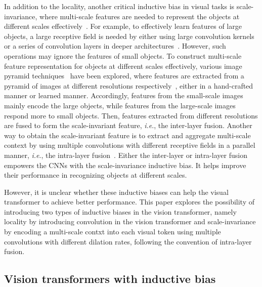 \documentclass[twocolumn]{svjour3}          \smartqed  \usepackage{natbib}
\newcommand{\ie}{i.e}
\def\onedot{.\xspace}
\def\ie{\emph{i.e}\onedot}
\begin{document}
In addition to the locality, another critical inductive bias in visual tasks is scale-invariance, where multi-scale features are needed to represent the objects at different scales effectively~\citep{luo2016understanding,yu2016multi}. 
For example, to effectively learn features of large objects, a large receptive field is needed by either using large convolution kernels~\citep{yu2016multi,yu2017dilated} or a series of convolution layers in deeper architectures~\citep{he2016deep,huang2017densely,simonyan2014very,szegedy2015going}. However, such operations may ignore the features of small objects. 
To construct multi-scale feature representation for objects at different scales effectively, various image pyramid techniques~\citep{chen2017rethinking,adelson1984pyramid,olkkonen1996gaussian,burt1987laplacian,lai2017deep,demirel2010image} have been explored, where features are extracted from a pyramid of images at different resolutions respectively~\citep{lin2016efficient,chen2017rethinking,ng2003sift,rublee2011orb,ke2004pca,bay2006surf}, either in a hand-crafted manner or learned manner. Accordingly, features from the small-scale images mainly encode the large objects, while features from the large-scale images respond more to small objects. Then, features extracted from different resolutions are fused to form the scale-invariant feature, \ie, the inter-layer fusion. Another way to obtain the scale-invariant feature is to extract and aggregate multi-scale context by using multiple convolutions with different receptive fields in a parallel manner, \ie, the intra-layer fusion~\citep{zhao2017pyramid,szegedy2015going,szegedy2017inception,szegedy2016rethinking}. Either the inter-layer or intra-layer fusion empowers the CNNs with the scale-invariance inductive bias. It helps improve their performance in recognizing objects at different scales.

However, it is unclear whether these inductive biases can help the visual transformer to achieve better performance. This paper explores the possibility of introducing two types of inductive biases in the vision transformer, namely locality by introducing convolution in the vision transformer and scale-invariance by encoding a multi-scale contxt into each visual token using multiple convolutions with different dilation rates, following the convention of intra-layer fusion.

\subsection{Vision transformers with inductive bias}
\end{document}
